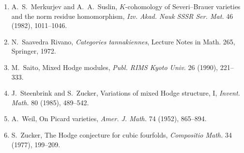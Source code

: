 \documentclass[11pt,a4paper]{article}
\theoremstyle{plain}
\theoremstyle{definition}
\begin{document}
\begin{enumerate}
\item[{[27]}] A.~S.~Merkurjev and A.~A.~Suslin, $K$-cohomology of Severi--Brauer varieties and the norm residue homomorphism, \textit{Izv. Akad. Nauk SSSR Ser. Mat.} 46 (1982), 1011--1046.

\item[{[28]}] N.~Saavedra Rivano, \textit{Categories tannakiennes}, Lecture Notes in Math. 265, Springer, 1972.

\item[{[29]}] M.~Saito, Mixed Hodge modules, \textit{Publ. RIMS Kyoto Univ.} 26 (1990), 221--333.

\item[{[30]}] J.~Steenbrink and S.~Zucker, Variations of mixed Hodge structure, I, \textit{Invent. Math.} 80 (1985), 489--542.

\item[{[31]}] A.~Weil, On Picard varieties, \textit{Amer. J. Math.} 74 (1952), 865--894.

\item[{[32]}] S.~Zucker, The Hodge conjecture for cubic fourfolds, \textit{Compositio Math.} 34 (1977), 199--209.
\end{enumerate}
\end{document}
